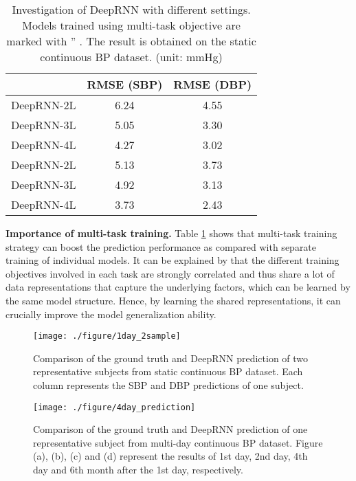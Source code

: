 \documentclass[letterpaper, 10 pt, conference]{ieeeconf}
\begin{document}
 \begin{table}[]
 \centering
 \begin{tabular}{r|c|c}
 \hline
     		 & RMSE (SBP) & RMSE (DBP) \\ \hline \hline
 DeepRNN-2L  & 6.24          & 4.55       \\ \hline
 DeepRNN-3L  & 5.05         & 3.30         \\ \hline
 DeepRNN-4L  & 4.27         & 3.02          \\ \hline 
 \hline
 DeepRNN-2L \text{\dag}  & 5.13          & 3.73      \\ \hline
 DeepRNN-3L \text{\dag}  &  4.92	 	& 3.13         \\ \hline
 DeepRNN-4L \text{\dag} & 3.73          & 2.43          \\ \hline 
 \end{tabular}
 \caption{Investigation of DeepRNN with different settings.
 Models trained using multi-task objective are marked with '' .
  The result is obtained on the static continuous BP dataset. (unit: mmHg)}
 \label{tab:multitask}
 \end{table}
 
\textbf{Importance of multi-task training.}
Table \ref{tab:multitask} shows that multi-task training strategy can boost the prediction performance as compared with separate training of individual models.
It can be explained by that the different training objectives involved in each task are strongly correlated and thus share a lot of data representations that capture 
the underlying factors, which can be learned by the same model structure.
Hence, by learning the shared representations, it can crucially improve the model generalization ability.
\begin{figure*}
\centering
\texttt{[image: ./figure/1day\_2sample]}
\caption{Comparison of the ground truth and DeepRNN prediction of two  representative subjects from static continuous BP dataset. Each column represents the SBP and DBP predictions of one subject.}
\label{fig:1day}
\end{figure*}

\begin{figure*}
\centering
\texttt{[image: ./figure/4day\_prediction]}
\caption{Comparison of the ground truth and DeepRNN prediction of one representative subject from multi-day continuous BP dataset. Figure (a), (b), (c) and (d) represent the results of 1st day, 2nd day, 4th day and 6th month after the 1st day, respectively.}
\label{fig:2}
\end{figure*}
\end{document}
